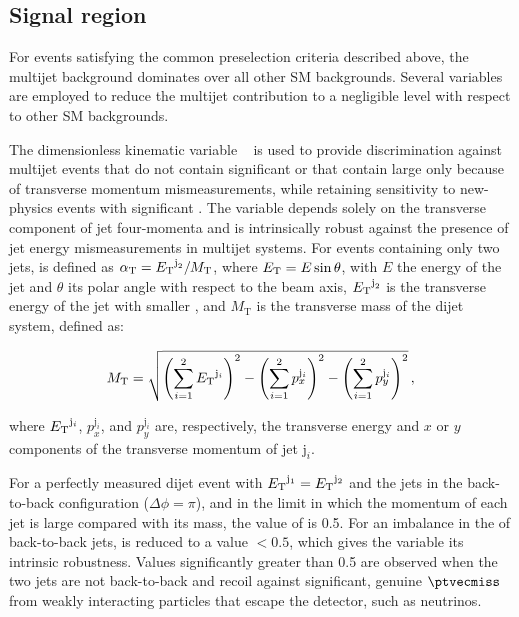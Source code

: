 \subsection{Signal region}
\label{sec:signal_region} 

For events satisfying the common preselection criteria described
above, the multijet background dominates over all other SM
backgrounds. Several variables are employed to reduce the multijet
contribution to a negligible level with respect to other SM
backgrounds.

The dimensionless kinematic variable \alphat~\cite{Randall:2008rw,
  RA1Paper} is used to provide discrimination against multijet events
that do not contain significant \ptvecmiss or that contain large
\ptvecmiss only because of transverse momentum mismeasurements, while
retaining sensitivity to new-physics events with significant
\ptvecmiss. The \alphat variable depends solely on the transverse
component of jet four-momenta
and is intrinsically robust against the presence of jet energy
mismeasurements in multijet systems. For events containing only two
jets, \alphat is defined as $\alpha_{\text{T}} = {E_{\text T}}^{\text j_2}/M_\text{T}$,
where ${E_{\text T}} = E\sin\theta$, with $E$ the energy of the jet and $\theta$
its polar angle with respect to the beam axis, ${E_{\text T}}^{\text j_2}$ is
the transverse energy of the jet with smaller \Et, and $M_\text{T}$ is
the transverse mass of the dijet system, defined as:

\begin{equation}
  \label{eq:mt}
  M_\text{T} = \sqrt{ \left( \sum_{i=1}^2 {E_{\text T}}^{\mathrm{j}_i}
    \right)^2 - \left( \sum_{i=1}^2 p_x^{\mathrm{j}_i} \right)^2 - \left(
      \sum_{i=1}^2 p_y^{\mathrm{j}_i} \right)^2}\, ,
\end{equation}

where ${E_{\text T}}^{\mathrm{j}_i}$, $p_x^{\mathrm{j}_i}$, and
$p_y^{\mathrm{j}_i}$ are, respectively, the transverse energy and $x$
or $y$ components of the transverse momentum of jet $\mathrm{j}_i$.

For a perfectly measured dijet event with ${E_{\text T}}^{\mathrm{j}_1} =
{E_{\text T}}^{\mathrm{j}_2}$ and the jets in the back-to-back configuration
($\Delta\phi = \pi$), and in the limit in which the momentum of each
jet is large compared with its mass, the value of \alphat is 0.5. For
an imbalance in the \Et of back-to-back jets, \alphat is reduced to a
value $<0.5$, which gives the variable its intrinsic
robustness. Values significantly greater than 0.5 are observed when
the two jets are not back-to-back and recoil against significant,
genuine $\ptvecmiss$ from weakly interacting particles that escape the
detector, such as neutrinos.


